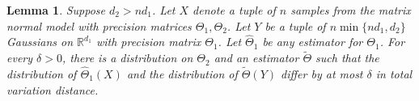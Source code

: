 \documentclass[aos]{imsart}
\newtheorem{lemma}[theorem]{Lemma}
\theoremstyle{definition}
\numberwithin{equation}{section}
\newcommand{\R}{{\mathbb{R}}}
\begin{document}
\begin{lemma}\label{lem:reduce-lower}Suppose $d_2 > n d_1$. Let $X$ denote a tuple of $n$ samples from the matrix normal model with precision matrices $\Theta_1, \Theta_2$. Let $Y$ be a tuple of $n\min\{nd_1, d_2\}$ Gaussians on $\R^{d_1}$ with precision matrix $\Theta_1$. Let $\widehat{\Theta}_1$ be any estimator for $\Theta_1$. For every $\delta > 0$, there is a distribution on $\Theta_2$ and an estimator $\tilde{\Theta}$ such that the distribution of $\widehat{\Theta}_1(X)$ and the distribution of $\tilde{\Theta}(Y)$ differ by at most $\delta$ in total variation distance. 
\end{lemma}
\end{document}
